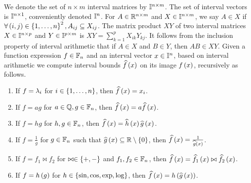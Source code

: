 We denote the set of $n\times m$ interval matrices by $\mathbb{I}^{n\times m}$.
The set of interval vectors is $\mathbb{I}^{n\times 1}$, conveniently
denoted $\mathbb{I}^{n}$.  For $A\in\mathbb{R}^{n\times m}$ and
$X\in\mathbb{I}^{n\times m}$, we say $A\in X$ if
$\forall \left(i,j\right)\in\left\{1,\ldots,n\right\}^2, A_{ij}\subseteq X_{ij}$.  The
matrix product $XY$ of two interval matrices $X\in\mathbb{I}^{n\times
p}$ and $Y\in\mathbb{I}^{p\times m}$ is $XY
= \sum_{k=1}^pX_{ik}Y_{kj}$.  It follows from the inclusion property
of interval arithmetic that if $A\in X$ and $B\in Y$, then $AB\in XY$.
Given a function expression $f\in\mathbb{F}_{n}$ and an interval vector
$x\in\mathbb{I}^n$, based on interval arithmetic we compute interval
bounds $\widehat{f}\left(x\right)$ on its image $f\left(x\right)$, recursively as follows.
%
\begin{enumerate}
\item If $f = \lambda_{i}$ for $i\in\left\{1,\ldots,n\right\}$, then $\widehat{f}\left(x\right) =
x_i$.
\item If $f = ag$ for $a\in\mathbb{Q}, g\in\mathbb{F}_{n}$, then $\widehat{f}\left(x\right) =
a\widehat{f}\left(x\right)$.
\item If $f = hg$ for $h,g\in\mathbb{F}_{n}$, then $\widehat{f}\left(x\right)
= \widehat{h}\left(x\right)\widehat{g}\left(x\right)$.
\item If $f = \frac{1}{g}$ for $g\in\mathbb{F}_{n}$ such that
$\widehat{g}\left(x\right)\subseteq\mathbb{R}\setminus \left\{0\right\}$, then $\widehat{f}\left(x\right)
= \frac{1}{\widehat{g}\left(x\right)}$.
\item If $f = f_1\bowtie f_2$ for $\bowtie\in\left\{+,-\right\}$ and
$f_1,f_2\in\mathbb{F}_{n}$, then $\widehat{f}\left(x\right) = \widehat{f_1}\left(x\right)\bowtie\widehat{f_2}\left(x\right)$.
\item If $f = h\left(g\right)$ for $h\in\left\{\sin, \cos, \exp, \log\right\}$, then
$\widehat{f}\left(x\right) = h\left(\widehat{g}\left(x\right)\right)$.
\end{enumerate}
%



